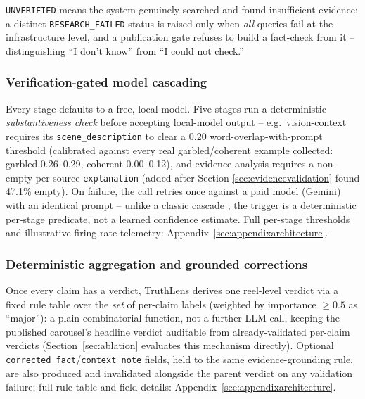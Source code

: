 \documentclass[conference]{IEEEtran}
\begin{document}
\texttt{UNVERIFIED} means the system genuinely searched and found
insufficient evidence; a distinct \texttt{RESEARCH\_FAILED} status is
raised only when \emph{all} queries fail at the infrastructure level, and
a publication gate refuses to build a fact-check from it -- distinguishing
``I don't know'' from ``I could not check.''

\subsubsection{Verification-gated model cascading}
\label{sec:cascade}
Every stage defaults to a free, local model. Five stages run a
deterministic \emph{substantiveness check} before accepting local-model
output -- e.g.\ vision-context requires its \texttt{scene\_description}
to clear a 0.20 word-overlap-with-prompt threshold (calibrated against
every real garbled/coherent example collected: garbled 0.26--0.29,
coherent 0.00--0.12), and evidence analysis requires a non-empty
per-source \texttt{explanation} (added after Section
\ref{sec:evidencevalidation} found 47.1\% empty). On failure, the call
retries once against a paid model (Gemini) with an identical prompt --
unlike a classic cascade \cite{chen2023frugalgpt}, the trigger is a
deterministic per-stage predicate, not a learned confidence estimate.
Full per-stage thresholds and illustrative firing-rate telemetry:
Appendix~\ref{sec:appendixarchitecture}.

\subsubsection{Deterministic aggregation and grounded corrections}
\label{sec:aggregation}
Once every claim has a verdict, TruthLens derives one reel-level verdict
via a fixed rule table over the \emph{set} of per-claim labels (weighted
by importance $\geq 0.5$ as ``major''): a plain combinatorial function,
not a further LLM call, keeping the published carousel's headline verdict
auditable from already-validated per-claim verdicts
(Section~\ref{sec:ablation} evaluates this mechanism directly). Optional
\texttt{corrected\_fact}/\texttt{context\_note} fields, held to the same
evidence-grounding rule, are also produced and invalidated alongside the
parent verdict on any validation failure; full rule table and field
details: Appendix~\ref{sec:appendixarchitecture}.
\end{document}
